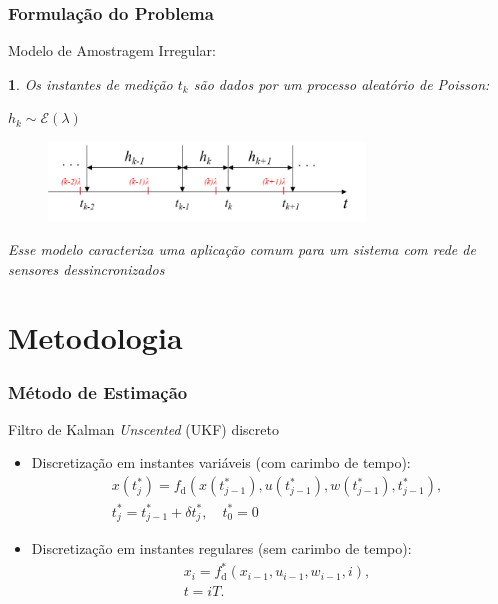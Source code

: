 \documentclass{beamer}
\newtheorem{definicao}{}
\begin{document}

\begin{frame}
	\frametitle{Formulação do Problema}
	Modelo de Amostragem Irregular:
	
	\begin{definicao}
		Os instantes de medição $t_k$ são dados por um processo aleatório de Poisson:
		
		\centering
		$h_k \sim \mathcal{E} (\lambda)$
	\end{definicao}
	
	\begin{figure}
		\centering
		\includegraphics[width=0.75\textwidth]{images/processo_amost.png}
	\end{figure}
	
	\small
	\centering
	\textit{Esse modelo caracteriza uma aplicação comum para um sistema com rede de sensores dessincronizados \cite{Micheli2002}}

\end{frame}


\section{Metodologia} 



\begin{frame}
	\frametitle{Método de Estimação}
	
	Filtro de Kalman \textit{Unscented} (UKF) discreto \cite{Julier2004}
	
	\vspace{0.25cm}
	\begin{itemize}
		\item Discretização em instantes variáveis (com carimbo de tempo):	
		\begin{align*}
		&x(t^*_j)=f_{\textrm{d}}(x(t^*_{j-1}),u(t^*_{j-1}),w(t^*_{j-1}),t^*_{j-1}),\\
		&t^*_j= t^*_{j-1} + \delta t^*_j, \quad  t^*_0=0
		\end{align*}
		
		\vspace{0.25cm}
		\item Discretização em instantes regulares (sem carimbo de tempo):
		\begin{align*}
		&x_i=f^*_{\textrm{d}}(x_{i-1},u_{i-1},w_{i-1},i),\\
		&t=iT.
		\end{align*}
		
	\end{itemize}


\end{frame}
\end{document}
